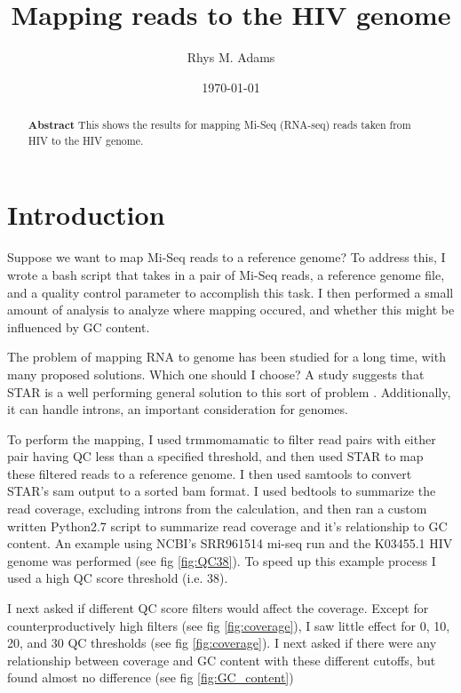 \documentclass[article]{revtex4}
\begin{document}
\title{Mapping reads to the HIV genome}
\author{Rhys M. Adams}
\date{\today}

\begin{abstract}
\textbf{Abstract}
This shows the results for mapping Mi-Seq (RNA-seq) reads taken from HIV to the HIV genome. 
\end{abstract}

\maketitle

\section{Introduction}
Suppose we want to map Mi-Seq reads to a reference genome? To address this, I wrote a bash script that takes in a pair of Mi-Seq reads, a reference genome file, and a quality control parameter to accomplish this task. I then performed a small amount of analysis to analyze where mapping occured, and whether this might be influenced by GC content.

The problem of mapping RNA to genome has been studied for a long time, with many proposed solutions. Which one should I choose? A study suggests that STAR is a well performing general solution to this sort of problem \cite{engstrom_systematic_2013}. Additionally, it can handle introns, an important consideration for genomes.

To perform the mapping, I used trmmomamatic to filter read pairs with either pair having QC less than a specified threshold, and then used STAR to map these filtered reads to a reference genome. I then used samtools to convert STAR's sam output to a sorted bam format. I used bedtools to summarize the read coverage, excluding introns from the calculation, and then ran a custom written Python2.7 script to summarize read coverage and it's relationship to GC content. An example using NCBI's SRR961514 mi-seq run and the K03455.1 HIV genome was performed (see fig \ref{fig:QC38}). To speed up this example process I used a high QC score threshold (i.e. 38).

I next asked if different QC score filters would affect the coverage. Except for counterproductively high filters (see fig \ref{fig:coverage}), I saw little effect for 0, 10, 20, and 30 QC thresholds (see fig \ref{fig:coverage}). I next asked if there were any relationship between coverage and GC content with these different cutoffs, but found almost no difference (see fig \ref{fig:GC_content})
\end{document}
